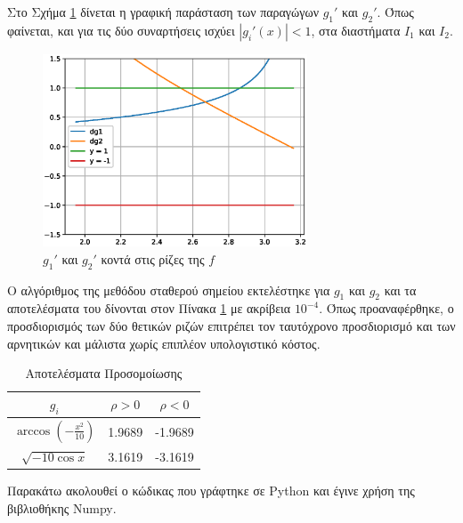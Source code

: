 \documentclass[assignment2.tex]{subfiles}
\begin{document}
Στο Σχήμα \ref{fig:dg1_dg2} δίνεται η γραφική παράσταση των παραγώγων $g_1'$ και $g_2'$. Όπως φαίνεται, και για τις δύο συναρτήσεις ισχύει $|g_i'(x)|<1$, στα διαστήματα $Ι_1$ και $Ι_2$.
\begin{figure}[hp]
\includegraphics[width=0.7\textwidth]{dg1_dg2.eps}
\centering
\caption{$g_1'$ και $g_2'$ κοντά στις ρίζες της $f$}
\label{fig:dg1_dg2}
\end{figure} 

Ο αλγόριθμος της μεθόδου σταθερού σημείου εκτελέστηκε για $g_1$ και $g_2$ και τα αποτελέσματα του δίνονται στον Πίνακα \ref{table:fixed_point} με ακρίβεια $10^{-4}$. Όπως προαναφέρθηκε, ο προσδιορισμός των δύο θετικών ριζών επιτρέπει τον ταυτόχρονο προσδιορισμό και των αρνητικών και μάλιστα χωρίς επιπλέον υπολογιστικό κόστος.

\begin{table}[ht]
\centering
\begin{tabular}{||c c c||} 
	\hline
	$g_i$& $\rho>0$ & $\rho<0$ \\ [0.5ex] 
	\hline\hline
	$\arccos \left(-\frac{x^2}{10}\right)$ & 1.9689 & -1.9689 \\ 
	\hline
	$\sqrt{-10\cos x}$ & 3.1619 & -3.1619 \\ [1ex] 
	\hline
\end{tabular}
\caption{Αποτελέσματα Προσομοίωσης}
\label{table:fixed_point}
\end{table}

Παρακάτω ακολουθεί ο κώδικας που γράφτηκε σε \textlatin{Python} και έγινε χρήση της βιβλιοθήκης \textlatin{Numpy}.

\end{document}
